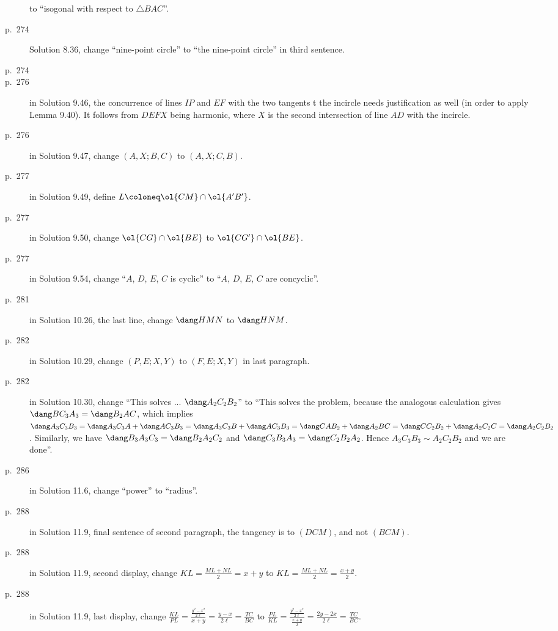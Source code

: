 \documentclass[11pt]{scrartcl}
\begin{document}
\begin{description}
  to ``isogonal with respect to $\triangle{BAC}$''.
\item[p.\  274] Solution 8.36, change ``nine-point circle''
  to ``the nine-point circle'' in third sentence.
\item[p.\  274] 
\item[p.\  276] in Solution 9.46, the concurrence of lines $IP$ and $EF$
  with the two tangents t the incircle needs justification as well
  (in order to apply Lemma 9.40). It follows from $DEFX$ being harmonic,
  where $X$ is the second intersection of line $AD$ with the incircle.
\item[p.\  276] in Solution 9.47, change $(A,X;B,C)$ to $(A,X;C,B)$.
\item[p.\  277] in Solution 9.49, define $L \coloneq \ol{CM} \cap \ol{A'B'}$.
\item[p.\  277] in Solution 9.50, change $\ol{CG} \cap \ol{BE}$ to $\ol{CG'} \cap \ol{BE}$.
\item[p.\  277] in Solution 9.54, change ``$A$, $D$, $E$, $C$ is cyclic'' to ``$A$, $D$, $E$, $C$ are concyclic''.
\item[p.\  281] in Solution 10.26, the last line, change $\dang HMN$ to $\dang HNM$.
\item[p.\  282] in Solution 10.29, change $(P,E;X,Y)$ to $(F,E;X,Y)$ in last paragraph.
\item[p.\  282] in Solution 10.30, change ``This solves ... $\dang A_2C_2B_2$'' to
  ``This solves the problem, because the analogous calculation gives $\dang BC_3A_3 = \dang B_2AC$,
  which implies $\dang A_3C_3B_3 = \dang A_3C_3A + \dang AC_3B_3 = \dang A_3C_3B + \dang AC_3B_3
  = \dang CAB_2 + \dang A_2BC = \dang CC_2B_2 + \dang A_2C_2C = \dang A_2C_2B_2$.
  Similarly, we have $\dang B_3A_3C_3 = \dang B_2A_2C_2$ and $\dang C_3B_3A_3 = \dang C_2B_2A_2$.
  Hence $A_3C_3B_3 \sim A_2C_2B_2$ and we are done''.
\item[p.\  286] in Solution 11.6, change ``power'' to ``radius''.
\item[p.\  288] in Solution 11.9, final sentence of second paragraph,
  the tangency is to $(DCM)$, and not $(BCM)$.
\item[p.\  288] in Solution 11.9, second display, change $KL = \frac{ML + NL}{2} = x + y$ to $KL = \frac{ML + NL}{2} = \frac{x + y}{2}$.
\item[p.\  288] in Solution 11.9, last display, change $\frac{KL}{PL} = \frac{\frac{y^2 - x^2}{2\ell}}{x + y} = \frac{y - x}{2\ell} = \frac{TC}{BC}$ to $\frac{PL}{KL} = \frac{\frac{y^2 - x^2}{2\ell}}{\frac{x + y}{2}} = \frac{2y - 2x}{2\ell} = \frac{TC}{BC}$.

\end{description}
\end{document}
